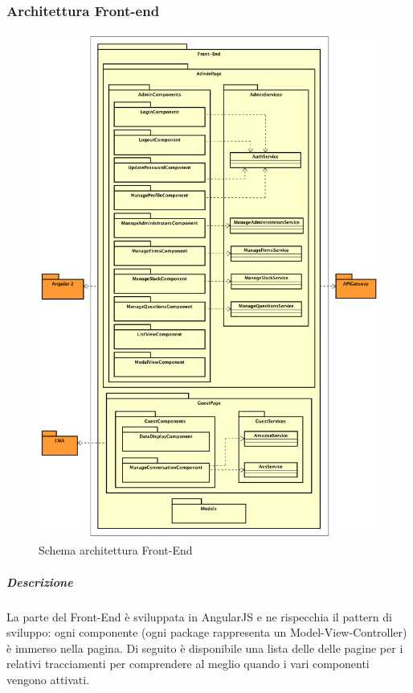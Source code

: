 \documentclass[../DefinizioneDiProdotto_v3.0.0.tex]{subfiles}
\begin{document}
\subsubsection{Architettura Front-end}
\begin{figure}[!h]
	\centering
	\includegraphics[scale=0.45]{Architettura/Front-end.png}
	\caption{Schema architettura Front-End}
\end{figure}

\subparagraph{Descrizione}	La parte del Front-End è sviluppata in AngularJS e ne rispecchia il pattern di sviluppo: ogni componente (ogni package rappresenta un Model-View-Controller) è immerso nella pagina. Di seguito è disponibile una lista delle  delle pagine per i relativi tracciamenti per comprendere al meglio quando i vari componenti vengono attivati. \\
\end{document}
